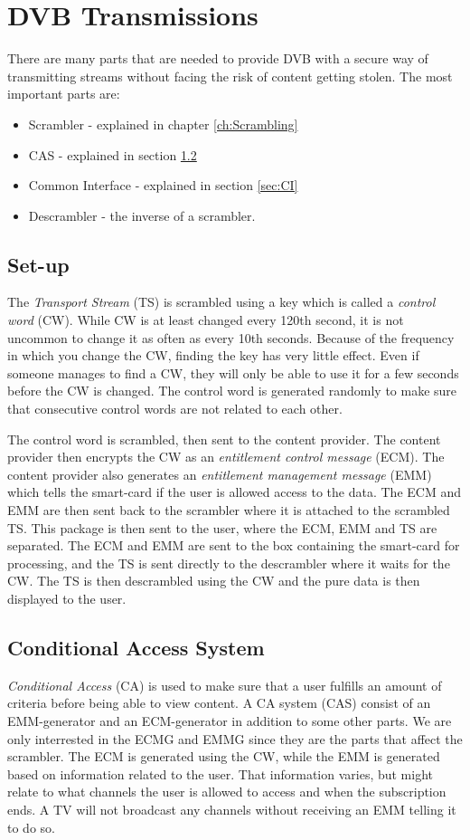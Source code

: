 \chapter{DVB Transmissions}
There are many parts that are needed to provide DVB with a secure way of 
transmitting streams without facing the risk of content getting stolen. The 
most important parts are:

\begin{itemize}
\item Scrambler - explained in chapter \ref{ch:Scrambling}
\item CAS - explained in section \ref{sec:CAS}
\item Common Interface - explained in section \ref{sec:CI}
\item Descrambler - the inverse of a scrambler.
\end{itemize}

\section{Set-up} \label{sec:setup}
The \emph{Transport Stream} (TS) is scrambled using a key which is called a 
\emph{control word} (CW). While CW is at least changed every 120th second, it is 
not uncommon to change it as often as every 10th seconds. Because of the 
frequency in which you change the CW, finding the key has very little effect. 
Even if someone manages to find a CW, they will only be able to use it for a few 
seconds before the CW is changed. The control word is generated randomly to make 
sure that consecutive control words are not related to each other. 

The control word is scrambled, then sent to the content provider. The content 
provider then encrypts the CW as an \emph{entitlement control message} (ECM). 
The content provider also generates an \emph{entitlement management message} 
(EMM) which tells the smart-card if the user is allowed access to the data. The 
ECM and EMM are then sent back to the scrambler where it is attached to the 
scrambled TS. This package is then sent to the user, where the ECM, EMM and TS 
are separated. The ECM and EMM are sent to the box containing the smart-card 
for processing, and the TS is sent directly to the descrambler where it waits 
for the CW. The TS is then descrambled using the CW and the pure data is then 
displayed to the user.

\section{Conditional Access System} \label{sec:CAS}
\emph{Conditional Access} (CA) is used to make sure that a user fulfills an 
amount of criteria before being able to view content. A CA system (CAS) consist 
of an EMM-generator and an ECM-generator in addition to some other parts. We are 
only interrested in the ECMG and EMMG since they are the parts that affect the 
scrambler. The ECM is generated using the CW, while the EMM is generated based 
on information related to the user. That information varies, but might relate to 
what channels the user is allowed to access and when the subscription ends. A 
TV will not broadcast any channels without receiving an EMM telling it to do so.

